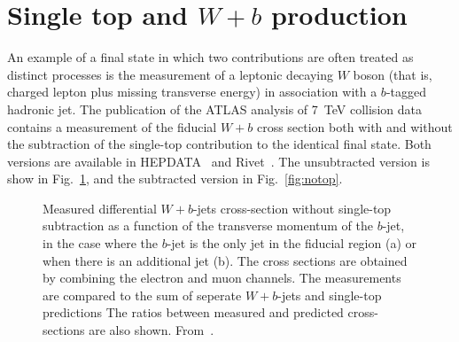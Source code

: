 \documentclass[floatfix]{article}
\begin{document}
\section{Single top and $W+b$ production}

An example of a final state in which two contributions are often treated as distinct processes is the measurement of a leptonic
decaying $W$ boson (that is, charged lepton plus missing transverse energy) in association with a $b$-tagged hadronic jet. 
The publication of the ATLAS analysis of 7~TeV collision data\cite{Aad:2013vka} contains a measurement of the fiducial $W+b$ 
cross section both with and without the subtraction of the single-top contribution to the identical final state. Both
versions are available in HEPDATA~\cite{} and Rivet~\cite{Buckley:2010ar}. The unsubtracted version is show in Fig.~\ref{fig:wb}, 
and the subtracted version in Fig.~\ref{fig:notop}. 

\begin{figure}%
\centering
{}
\caption{\label{fig:wb}
Measured differential $W+b$-jets cross-section without single-top subtraction as a function of the transverse momentum of the $b$-jet, in the case where the $b$-jet is the only jet in the fiducial region (a) or when there is an additional jet (b). The cross sections are obtained by combining the electron and muon channels. The measurements are compared to the sum of seperate $W+b$-jets and single-top predictions 
The ratios between measured and predicted cross-sections are also shown. From~\protect\cite{Aad:2013vka}.}
\end{figure}
\end{document}
